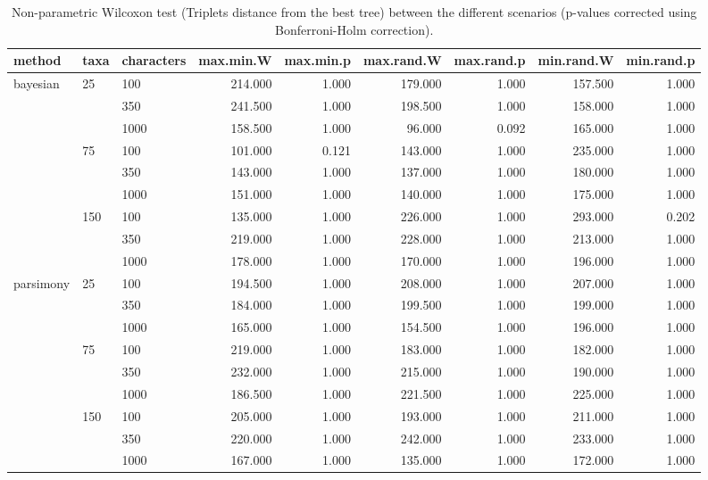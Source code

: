 \begin{table}[ht]
\centering
\begin{tabular}{lllrrrrrr}
  \hline
method & taxa & characters & max.min.W & max.min.p & max.rand.W & max.rand.p & min.rand.W & min.rand.p \\ 
  \hline
bayesian & 25 & 100 & 214.000 & 1.000 & 179.000 & 1.000 & 157.500 & 1.000 \\ 
   &  & 350 & 241.500 & 1.000 & 198.500 & 1.000 & 158.000 & 1.000 \\ 
   &  & 1000 & 158.500 & 1.000 & 96.000 & 0.092 & 165.000 & 1.000 \\ 
   & 75 & 100 & 101.000 & 0.121 & 143.000 & 1.000 & 235.000 & 1.000 \\ 
   &  & 350 & 143.000 & 1.000 & 137.000 & 1.000 & 180.000 & 1.000 \\ 
   &  & 1000 & 151.000 & 1.000 & 140.000 & 1.000 & 175.000 & 1.000 \\ 
   & 150 & 100 & 135.000 & 1.000 & 226.000 & 1.000 & 293.000 & 0.202 \\ 
   &  & 350 & 219.000 & 1.000 & 228.000 & 1.000 & 213.000 & 1.000 \\ 
   &  & 1000 & 178.000 & 1.000 & 170.000 & 1.000 & 196.000 & 1.000 \\ 
  parsimony & 25 & 100 & 194.500 & 1.000 & 208.000 & 1.000 & 207.000 & 1.000 \\ 
   &  & 350 & 184.000 & 1.000 & 199.500 & 1.000 & 199.000 & 1.000 \\ 
   &  & 1000 & 165.000 & 1.000 & 154.500 & 1.000 & 196.000 & 1.000 \\ 
   & 75 & 100 & 219.000 & 1.000 & 183.000 & 1.000 & 182.000 & 1.000 \\ 
   &  & 350 & 232.000 & 1.000 & 215.000 & 1.000 & 190.000 & 1.000 \\ 
   &  & 1000 & 186.500 & 1.000 & 221.500 & 1.000 & 225.000 & 1.000 \\ 
   & 150 & 100 & 205.000 & 1.000 & 193.000 & 1.000 & 211.000 & 1.000 \\ 
   &  & 350 & 220.000 & 1.000 & 242.000 & 1.000 & 233.000 & 1.000 \\ 
   &  & 1000 & 167.000 & 1.000 & 135.000 & 1.000 & 172.000 & 1.000 \\ 
   \hline
\end{tabular}
\caption{Non-parametric Wilcoxon test (Triplets distance from the best tree) between the different scenarios (p-values corrected using Bonferroni-Holm correction).} 
\label{Full_Tab_BCTrbest}
\end{table}
